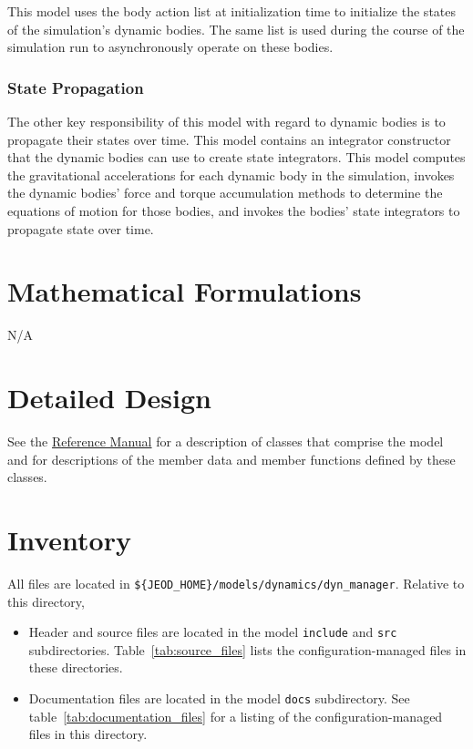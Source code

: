 This model uses the body action list
at initialization time to initialize the states of the simulation's
dynamic bodies. The same list is used during the course of the simulation
run to asynchronously operate on these bodies.

\subsubsection{State Propagation}
The other key responsibility of this model with regard to dynamic bodies
is to propagate their states over time. This model contains an integrator
constructor that the dynamic bodies can use to create state integrators.
This model computes the gravitational accelerations for each dynamic
body in the simulation, invokes the dynamic bodies' force and torque accumulation methods to determine the equations of motion for those bodies,
and invokes the bodies' state integrators to propagate state over time.

\section{Mathematical Formulations}
N/A
\section{Detailed Design}
See the \href{file:refman.pdf}{Reference Manual}\cite{DynManager:refman}
for a description of classes that comprise the model and for descriptions
of the member data and member functions defined by these classes.

\section{Inventory}
All \ModelDesc files are located in
{\tt \$\{JEOD\_HOME\}/models/dynamics/dyn\_manager}.
Relative to this directory,
\begin{itemize}
\vspace{-0.2\baselineskip}
\item Header and source files are located
in the model {\tt include} and {\tt src} subdirectories.
Table~\ref{tab:source_files} lists the
configuration-managed files in these directories.
\vspace{-0.1\baselineskip}
\item Documentation files are located in the model {\tt docs} subdirectory.
See table~\ref{tab:documentation_files}
for a listing of the
configuration-managed files in this directory.
\end{itemize}


